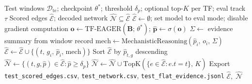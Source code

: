 \documentclass{article}
\newcommand{\TopK}{\mathrm{TopK}}
\begin{document}
\begin{algorithm}[H]
\caption{GRN Inference and Decoding}
\label{alg:inference}
\begin{algorithmic}[1]
\Require Test windows $\mathcal{D}_{\mathrm{te}}$; checkpoint $\theta^*$;
         threshold $\delta_p$; optional top-$K$ per TF; eval track $\tau$
\Ensure  Scored edges $\hat{\mathcal{E}}$;\; decoded network $\hat{\mathcal{N}} \subseteq \hat{\mathcal{E}}$
\State $\hat{\mathcal{E}} \leftarrow \emptyset$;\; set model to eval mode; disable gradient computation
  \State $\mathbf{o} \leftarrow \mathrm{TF\text{-}EAGER}(\mathbf{B};\,\theta^*)$;\;
         $\hat{\mathbf{p}} \leftarrow \sigma(\mathbf{o})$
    \State $\Sigma \leftarrow$ evidence summary from window record
    \State $\mathrm{mech} \leftarrow \mathrm{MechanisticReasoning}(\hat{p}_i,\, o_i,\, \Sigma)$
    \State $\hat{\mathcal{E}} \leftarrow \hat{\mathcal{E}} \cup \{(t,\, g_i,\, \hat{p}_i,\, \mathrm{mech})\}$
  \EndFor
\EndFor
\State Sort $\hat{\mathcal{E}}$ by $\hat{p}_{t,g}$ descending
\State $\hat{\mathcal{N}} \leftarrow \{(t, g, \hat{p}) \in \hat{\mathcal{E}} : \hat{p} \ge \delta_p\}$
    \State $\hat{\mathcal{N}} \leftarrow \hat{\mathcal{N}} \cup \TopK(\{e \in \hat{\mathcal{E}} : e.t = t\},\, K)$
  \EndFor
\EndIf
\State Export \texttt{test\_scored\_edges.csv}, \texttt{test\_network.csv},
       \texttt{test\_flat\_evidence.jsonl}
\State \Return $\hat{\mathcal{E}},\; \hat{\mathcal{N}}$
\end{algorithmic}
\end{algorithm}
\end{document}
